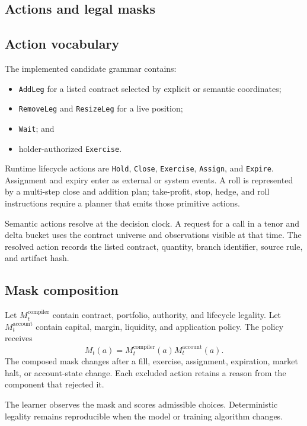 \documentclass{strategynet-journal}
\begin{document}
\begin{SNcolumns}
\section{Actions and legal masks}
\label{sec:actions}

\subsection{Action vocabulary}

The implemented candidate grammar contains:

\begin{itemize}
  \item \texttt{AddLeg} for a listed contract selected by explicit or semantic
        coordinates;
  \item \texttt{RemoveLeg} and \texttt{ResizeLeg} for a live position;
  \item \texttt{Wait}; and
  \item holder-authorized \texttt{Exercise}.
\end{itemize}

Runtime lifecycle actions are \texttt{Hold}, \texttt{Close},
\texttt{Exercise}, \texttt{Assign}, and \texttt{Expire}.  Assignment and
expiry enter as external or system events.  A roll is represented by a
multi-step close and addition plan; take-profit, stop, hedge, and roll
instructions require a planner that emits those primitive actions.

Semantic actions resolve at the decision clock.  A request for a call in a
tenor and delta bucket uses the contract universe and observations visible at
that time.  The resolved action records the listed contract, quantity, branch
identifier, source rule, and artifact hash.

\subsection{Mask composition}

Let \(M_t^{\mathrm{compiler}}\) contain contract, portfolio, authority, and
lifecycle legality.  Let \(M_t^{\mathrm{account}}\) contain capital, margin,
liquidity, and application policy.  The policy receives
\[
  M_t(a)
  =M_t^{\mathrm{compiler}}(a)
   M_t^{\mathrm{account}}(a).
\]
The composed mask changes after a fill, exercise, assignment, expiration,
market halt, or account-state change.  Each excluded action retains a reason
from the component that rejected it.

The learner observes the mask and scores admissible choices.  Deterministic
legality remains reproducible when the model or training algorithm changes.


\end{SNcolumns}
\end{document}
